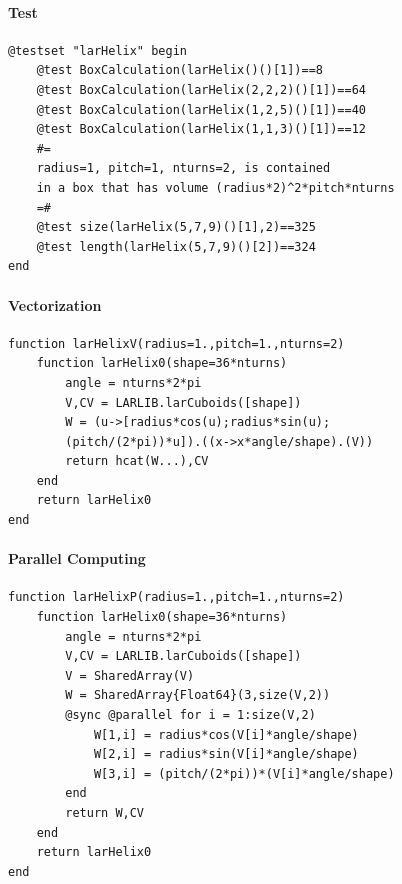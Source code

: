 \documentclass{article}
\begin{document}
\paragraph{Test}

\begin{Verbatim}
@testset "larHelix" begin
	@test BoxCalculation(larHelix()()[1])==8
	@test BoxCalculation(larHelix(2,2,2)()[1])==64
	@test BoxCalculation(larHelix(1,2,5)()[1])==40
	@test BoxCalculation(larHelix(1,1,3)()[1])==12
	#=
	radius=1, pitch=1, nturns=2, is contained
	in a box that has volume (radius*2)^2*pitch*nturns
	=#
	@test size(larHelix(5,7,9)()[1],2)==325
	@test length(larHelix(5,7,9)()[2])==324
end
\end{Verbatim}

\paragraph{Vectorization}

\begin{verbatim}
function larHelixV(radius=1.,pitch=1.,nturns=2)
    function larHelix0(shape=36*nturns)
        angle = nturns*2*pi
        V,CV = LARLIB.larCuboids([shape])
        W = (u->[radius*cos(u);radius*sin(u);
        (pitch/(2*pi))*u]).((x->x*angle/shape).(V))
        return hcat(W...),CV
    end
    return larHelix0
end 
\end{verbatim}

\paragraph{Parallel Computing} 

\begin{Verbatim}
function larHelixP(radius=1.,pitch=1.,nturns=2)
    function larHelix0(shape=36*nturns)
        angle = nturns*2*pi
        V,CV = LARLIB.larCuboids([shape])
        V = SharedArray(V)
        W = SharedArray{Float64}(3,size(V,2))
        @sync @parallel for i = 1:size(V,2)
            W[1,i] = radius*cos(V[i]*angle/shape)  
            W[2,i] = radius*sin(V[i]*angle/shape)
            W[3,i] = (pitch/(2*pi))*(V[i]*angle/shape)
        end
        return W,CV
    end
    return larHelix0
end
\end{Verbatim}
\end{document}
